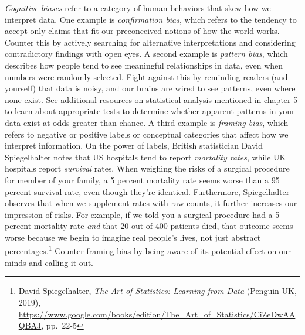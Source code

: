 \documentclass[
  english,
]{book}
\begin{document}
\emph{Cognitive biases} refer to a category of human behaviors that skew how we interpret data. One example is \emph{confirmation bias}, which refers to the tendency to accept only claims that fit our preconceived notions of how the world works. Counter this by actively searching for alternative interpretations and considering contradictory findings with open eyes. A second example is \emph{pattern bias}, which describes how people tend to see meaningful relationships in data, even when numbers were randomly selected. Fight against this by reminding readers (and yourself) that data is noisy, and our brains are wired to see patterns, even where none exist. See additional resources on statistical analysis mentioned in \href{comparisons.html}{chapter 5} to learn about appropriate tests to determine whether apparent patterns in your data exist at odds greater than chance. A third example is \emph{framing bias}, which refers to negative or positive labels or conceptual categories that affect how we interpret information. On the power of labels, British statistician David Spiegelhalter notes that US hospitals tend to report \emph{mortality rates}, while UK hospitals report \emph{survival} rates. When weighing the risks of a surgical procedure for member of your family, a 5 percent mortality rate seems worse than a 95 percent survival rate, even though they're identical. Furthermore, Spiegelhalter observes that when we supplement rates with raw counts, it further increases our impression of risks. For example, if we told you a surgical procedure had a 5 percent mortality rate \emph{and} that 20 out of 400 patients died, that outcome seems worse because we begin to imagine real people's lives, not just abstract percentages.\footnote{David Spiegelhalter, \emph{The {Art} of {Statistics}: {Learning} from {Data}} ({Penguin UK}, 2019), \url{https://www.google.com/books/edition/The_Art_of_Statistics/CiZeDwAAQBAJ}, pp.~22-5} Counter framing bias by being aware of its potential effect on our minds and calling it out.
\end{document}
